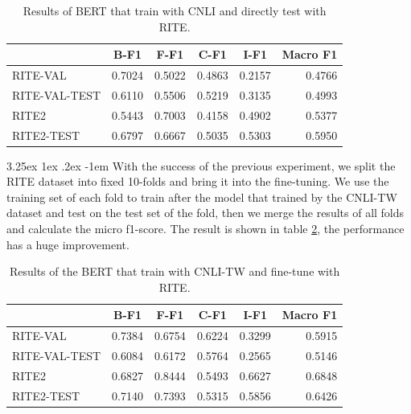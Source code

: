 \documentclass[12pt]{article}
\makeatletter
\renewcommand\paragraph{\@startsection{paragraph}{5}{\z@}%
  {3.25ex \@plus1ex \@minus.2ex}%
  {-1em}%
  {\normalfont\normalsize\bfseries}}
\makeatother
\begin{document}
\begin{CJK*}{UTF8}{bkai}
\begin{spacing}{1.77}
\begin{table}[H]
  \centering
  \setlength{\extrarowheight}{-3pt}
  \begin{tabular}{|l|r|r|r|r|r|}
  \hline
   & \multicolumn{1}{c|}{B-F1} & \multicolumn{1}{c|}{F-F1} & \multicolumn{1}{c|}{C-F1} & \multicolumn{1}{c|}{I-F1} & \multicolumn{1}{c|}{Macro F1} \\ \hline
  RITE-VAL & 0.7024 & 0.5022 & 0.4863 & 0.2157 & 0.4766 \\ \hline
  RITE-VAL-TEST & 0.6110 & 0.5506 & 0.5219 & 0.3135 & 0.4993 \\ \hline
  RITE2 & 0.5443 & 0.7003 & 0.4158 & 0.4902 & 0.5377 \\ \hline
  RITE2-TEST & 0.6797 & 0.6667 & 0.5035 & 0.5303 & 0.5950 \\ \hline
  \end{tabular}
  \caption{Results of BERT that train with CNLI and directly test with RITE.}
  \label{result:bert_cnli}
\end{table}

\paragraph{}
With the success of the previous experiment, we split the RITE dataset into fixed 10-folds and bring it into the fine-tuning. We use the training set of each fold to train after the model that trained by the CNLI-TW dataset and test on the test set of the fold, then we merge the results of all folds and calculate the micro f1-score. The result is shown in table \ref{result:bert_cnli_transfer}, the performance has a huge improvement.

\begin{table}[H]
  \centering
  \setlength{\extrarowheight}{-3pt}
  \begin{tabular}{|l|r|r|r|r|r|}
  \hline
   & \multicolumn{1}{c|}{B-F1} & \multicolumn{1}{c|}{F-F1} & \multicolumn{1}{c|}{C-F1} & \multicolumn{1}{c|}{I-F1} & \multicolumn{1}{c|}{Macro F1} \\ \hline
  RITE-VAL & 0.7384 & 0.6754 & 0.6224 & 0.3299 & 0.5915 \\ \hline
  RITE-VAL-TEST & 0.6084 & 0.6172 & 0.5764 & 0.2565 & 0.5146 \\ \hline
  RITE2 & 0.6827 & 0.8444 & 0.5493 & 0.6627 & 0.6848 \\ \hline
  RITE2-TEST & 0.7140 & 0.7393 & 0.5315 & 0.5856 & 0.6426 \\ \hline
  \end{tabular}
  \caption{Results of the BERT that train with CNLI-TW and fine-tune with RITE.}
  \label{result:bert_cnli_transfer}
\end{table}


\end{spacing}
\end{CJK*}
\end{document}
